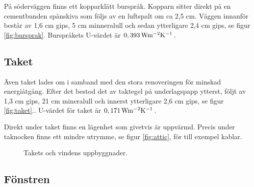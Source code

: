 På söderväggen finns ett kopparklätt burspråk. Kopparn sitter direkt på en cementbunden spånskiva som följs av en luftspalt om ca 2,5 cm. Väggen innanför består av 1,6 cm gips, 5 cm minneralull och sedan ytterligare 2,4 cm gips, se figur \ref{fig:bursprak}.\cite{kandidatarbete2010} Burspråkets U-värdet är $\unit[0,393]{Wm^{-2}K^{-1}}$.

\subsection{Taket}
Även taket lades om i samband med den stora renoveringen för minskad energiåtgång. Efter det bestod det av taktegel på underlagspapp ytterst, följt av 1,3 cm gips, 21 cm mineralull och innerst ytterligare 2,6 cm gips, se figur \ref{fig:taket}.\cite{kandidatarbete2010}. U-värdet för taket är $\unit[0,171]{Wm^{-2}K^{-1}}$.

Direkt under taket finns en lägenhet som givetvis är uppvärmd. Precis under taknocken finns ett mindre utrymme, se figur \ref{fig:attic}, för till exempel kablar.

\begin{figure}[hpbt]
\centering
{}
\caption{\label{fig:roof_attic} Takets och vindens uppbyggnader.}
\end{figure}


\subsection{Fönstren}

